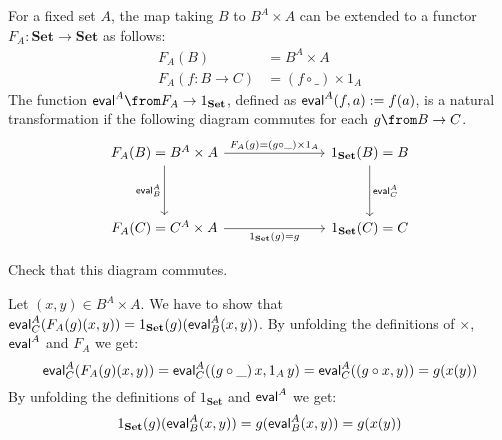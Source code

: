\begin{exercise}
  For a fixed set $A$, the map taking $B$ to $B^A \times A$ can be extended to
  a functor $F_A:\mathbf{Set} \to \mathbf{Set}$ as follows:
  \begin{align*}
    F_A(B) & =  B^A \times A\\
    F_A(f: B \to C) & =  (f \circ \_) \times 1_A
  \end{align*}
  The function $\eval{A} \from F_A \to 1_{\mathbf{Set}}$, defined as $\mathsf{eval}^{A}(f,a) := f(a)$, is a natural transformation if the following diagram commutes for each $g \from B \to C$.
\[
  \begin{tikzcd}
    F_A(B) = B^A \times A \arrow{rrr}{F_A(g)=(g\circ \_) \times 1_A} \arrow{dd}[swap]{\eval{A}_B} & & & 1_{\mathbf{Set}}(B) = B \arrow{dd}{\eval{A}_C} \\
                                                                                           & & & \\
    F_A(C) = C^A \times A \arrow{rrr}[swap]{1_{\mathbf{Set}}(g) = g} & & & 1_{\mathbf{Set}}(C) = C
  \end{tikzcd}
\]

Check that this diagram commutes.
\end{exercise}
\begin{answer}
  Let $(x,y) \in B^A \times A$. We have to show that $\mathsf{eval}^{A}_C (F_A(g) (x,y)) = 1_{\mathbf {Set}}(g) (\mathsf{eval}^{A}_B (x, y))$.
  By unfolding the definitions of $\times$, $\mathsf{eval}^{A}$ and $F_A$ we get:
  \[
    \mathsf{eval}^{A}_C (F_A(g) (x,y)) =
    \mathsf{eval}^{A}_C ((g \circ \_)\,x, 1_A\,y) =
    \mathsf{eval}^{A}_C ((g \circ x, y)) =
    g (x (y))
    \]
  By unfolding the definitions of $1_{\mathbf {Set}}$ and $\mathsf{eval}^{A}$ we get:
  \[
    1_{\mathbf {Set}}(g) (\mathsf{eval}^{A}_B (x, y)) =
    g (\mathsf{eval}^{A}_B (x, y)) =
    g (x (y))
    \]
\end{answer}

